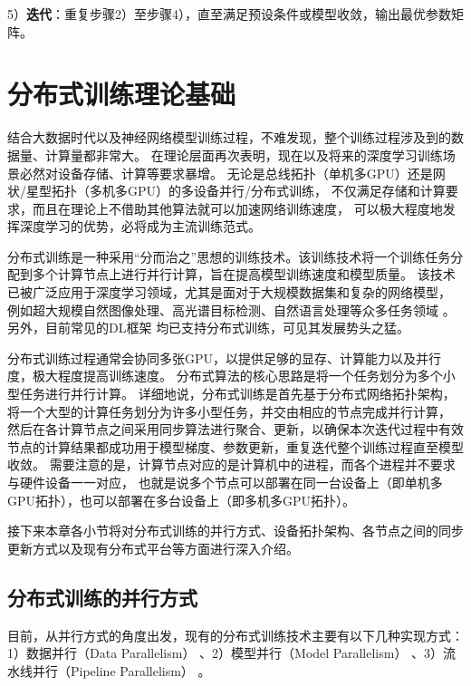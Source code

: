 \documentclass{xdupgthesis}
\begin{document}
5）\textbf{迭代}：重复步骤2）至步骤4），直至满足预设条件或模型收敛，输出最优参数矩阵。


\section{分布式训练理论基础}
结合大数据时代以及神经网络模型训练过程，不难发现，整个训练过程涉及到的数据量、计算量都非常大。
在理论层面再次表明，现在以及将来的深度学习训练场景必然对设备存储、计算等要求暴增。
无论是总线拓扑（单机多GPU）还是网状/星型拓扑（多机多GPU）的多设备并行/分布式训练，
不仅满足存储和计算要求，而且在理论上不借助其他算法就可以加速网络训练速度，
可以极大程度地发挥深度学习的优势，必将成为主流训练范式。

分布式训练是一种采用“分而治之”思想的训练技术。该训练技术将一个训练任务分配到多个计算节点上进行并行计算，旨在提高模型训练速度和模型质量。
该技术已被广泛应用于深度学习领域，尤其是面对于大规模数据集和复杂的网络模型，
例如超大规模自然图像处理、高光谱目标检测、自然语言处理等众多任务领域 \cite{JFYZ202101008}。
另外，目前常见的DL框架\cite{abadi2016tensorflow} \cite{ketkar2021introduction} \cite{jia2014caffe} \cite{gulli2017deep} \cite{seide2016cntk}均已支持分布式训练，可见其发展势头之猛。

分布式训练过程通常会协同多张GPU，以提供足够的显存、计算能力以及并行度，极大程度提高训练速度。
分布式算法的核心思路是将一个任务划分为多个小型任务进行并行计算。
详细地说，分布式训练是首先基于分布式网络拓扑架构，将一个大型的计算任务划分为许多小型任务，并交由相应的节点完成并行计算，
然后在各计算节点之间采用同步算法进行聚合、更新，以确保本次迭代过程中有效节点的计算结果都成功用于模型梯度、参数更新，重复迭代整个训练过程直至模型收敛。
需要注意的是，计算节点对应的是计算机中的进程，而各个进程并不要求与硬件设备一一对应，
也就是说多个节点可以部署在同一台设备上（即单机多GPU拓扑），也可以部署在多台设备上（即多机多GPU拓扑）。

接下来本章各小节将对分布式训练的并行方式、设备拓扑架构、各节点之间的同步更新方式以及现有分布式平台等方面进行深入介绍。

\subsection{分布式训练的并行方式}
\label{sec_DistributedParallsim}
目前，从并行方式的角度出发，现有的分布式训练技术主要有以下几种实现方式：1）数据并行（Data Parallelism） \cite{li2020pytorch}、2）模型并行（Model Parallelism） \cite{shoeybi2019megatron}、3）流水线并行（Pipeline Parallelism） \cite{huang2019gpipe}。
\end{document}
